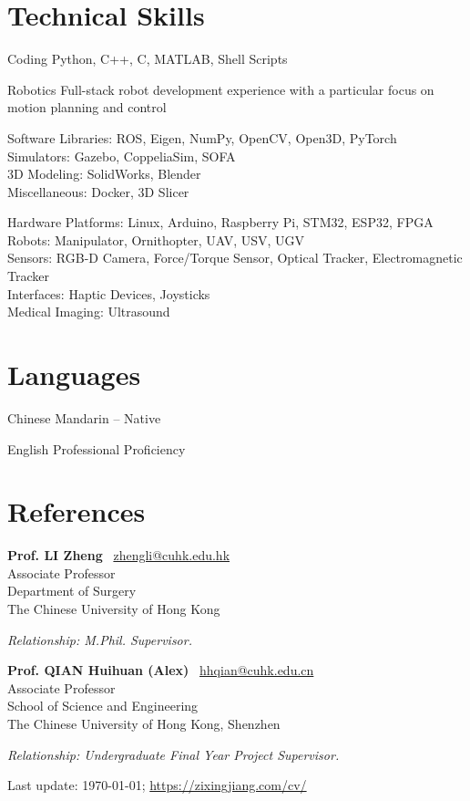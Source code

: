 \documentclass[11pt,letterpaper]{report}
\newcommand{\listitemspace}{0.25em}
\renewenvironment{itemize}
{\begin{list}{}{\setlength{\leftmargin}{0em}
			\setlength{\parskip}{0em}
			\setlength{\itemsep}{\listitemspace}
			\setlength{\parsep}{\listitemspace}}}
	{\end{list}}
\begin{document}
\section*{Technical Skills}
\begin{tablist}
	\item[Coding] \tab Python, C++, C, MATLAB, Shell Scripts
	\item[Robotics] \tab Full-stack robot development experience with a particular focus on motion planning and control
	\item[Software] \tab Libraries: ROS, Eigen, NumPy, OpenCV, Open3D, PyTorch\\
	Simulators: Gazebo, CoppeliaSim, SOFA\\
	3D Modeling: SolidWorks, Blender\\
	Miscellaneous: Docker, 3D Slicer
	\item[Hardware] \tab Platforms: Linux, Arduino, Raspberry Pi, STM32, ESP32, FPGA\\
	Robots: Manipulator, Ornithopter, UAV, USV, UGV\\ 
	Sensors: RGB-D Camera, Force/Torque Sensor, Optical Tracker, Electromagnetic Tracker\\
	Interfaces: Haptic Devices, Joysticks\\
	Medical Imaging: Ultrasound
\end{tablist}


\section*{Languages}
\begin{tablist}
	\item[Chinese] \tab Mandarin -- Native
	\item[English] \tab Professional Proficiency
\end{tablist}
\newpage
\section*{References}
\begin{itemize}
	\item \textbf{Prof. LI Zheng} ~{\scriptsize \faEnvelope}\href{mailto:zhengli@cuhk.edu.hk}{zhengli@cuhk.edu.hk}\\
	Associate Professor\\
	Department of Surgery\\
	The Chinese University of Hong Kong
	
	\textit{Relationship: M.Phil. Supervisor.}

	\vspace{1ex}
	
	\item \textbf{Prof. QIAN Huihuan (Alex)} ~{\scriptsize \faEnvelope}\href{mailto:hhqian@cuhk.edu.cn}{hhqian@cuhk.edu.cn}\\
	Associate Professor\\School of Science and Engineering\\The Chinese University of Hong Kong, Shenzhen

	\textit{Relationship: Undergraduate Final Year Project Supervisor.}

\end{itemize}
	
\begin{center}
	\vfill
	Last update: \monthyeardate\today; \href{https://zixingjiang.com/cv/}{https://zixingjiang.com/cv/}
\end{center}
	
\end{document}
